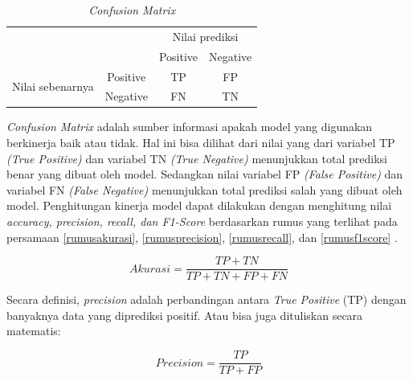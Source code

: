 
\begin{table}[H]
	\center
	\fontsize{10}{12}\selectfont
	\caption{\textit{Confusion Matrix}}
	\label{Precision-recall}
	\begin{tabular}{|lc|cc|}
		\hline
		\multicolumn{2}{|l|}{\multirow{2}{*}{}}                 & \multicolumn{2}{c|}{Nilai prediksi}                                \\ \cline{3-4}
		\multicolumn{2}{|l|}{}                                  & \multicolumn{1}{c|}{Positive}       & Negative                     \\ \hline
		\multicolumn{1}{|l|}{\multirow{2}{*}{Nilai sebenarnya}} & Positive                            & \multicolumn{1}{c|}{TP} & FP \\ \cline{2-4}
		\multicolumn{1}{|l|}{}                                  & Negative                            & \multicolumn{1}{c|}{FN} & TN \\ \hline
	\end{tabular}
\end{table}

\par \textit{Confusion Matrix} adalah sumber informasi apakah model yang digunakan berkinerja baik atau tidak. Hal ini bisa dilihat dari nilai yang dari variabel TP \textit{(True Positive)} dan variabel TN \textit{(True Negative)} menunjukkan total prediksi benar yang dibuat oleh model. Sedangkan nilai variabel FP \textit{(False Positive)} dan variabel FN \textit{(False Negative)} menunjukkan total prediksi salah yang dibuat oleh model. Penghitungan kinerja model dapat dilakukan dengan menghitung nilai \textit{accuracy, precision, recall, dan F1-Score} berdasarkan rumus yang terlihat pada persamaan \ref{rumusakurasi}, \ref{rumusprecision}, \ref{rumusrecall}, dan \ref{rumusf1score} \citep{precisionrecall}.

\begin{equation}
	\label{rumusakurasi}
	Akurasi = \frac{TP+TN}{TP+TN+FP+FN}
\end{equation}
\vspace{0.1cm}

\par Secara definisi, \textit{precision} adalah perbandingan antara \textit{True Positive} (TP) dengan banyaknya data yang diprediksi positif. Atau bisa juga dituliskan secara matematis:

\begin{equation}
	\label{rumusprecision}
	Precision = \frac{TP}{TP+FP}
\end{equation}
\vspace{0.1cm}

